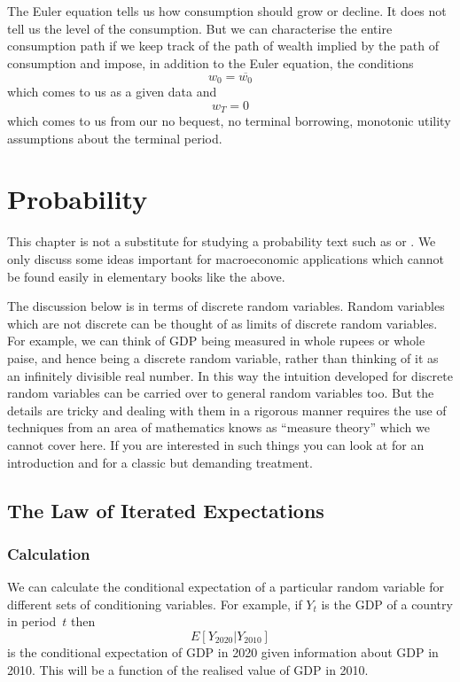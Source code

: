 \documentclass[11pt,reqno,openany]{amsbook}
\theoremstyle{plain}
\theoremstyle{definition}
\begin{document}
The Euler equation tells us how consumption should grow or decline. It
does not tell us the level of the consumption. But we can characterise
the entire consumption path if we keep track of
the path of wealth implied by the path of consumption and impose, in
addition to the Euler equation, the
conditions
\[w_0 = \overline{w_0}\]
which comes to us as a given data and 
\[w_T=0\]
which comes to us from our no bequest, no terminal borrowing,
monotonic utility assumptions about the terminal period.

\chapter{Probability}
This chapter is not a substitute for studying a probability text such
as \cite{chung-elementary} or \cite{ross-probability}. We only discuss
some ideas important for macroeconomic applications which cannot be
found easily in elementary books like the above. 

The discussion below is in terms of discrete random variables. Random
variables which are not discrete can be thought of as limits of
discrete random variables. For example, we can think of GDP being
measured in whole rupees or whole paise, and hence being a discrete
random variable, rather than thinking of it as an infinitely divisible
real number. In this way the intuition developed for discrete random
variables can be carried over to general random variables too. But the
details are tricky and dealing with them in a rigorous manner requires
the use of techniques from an area of mathematics knows as ``measure
theory'' which we cannot cover here. If you are interested in such
things you can look at \cite{jacod-protter-essentials} for an
introduction and \cite{billingsley-prob-measure} for a classic but
demanding treatment.

\section{The Law of Iterated Expectations}
\subsection{Calculation}
We can calculate the conditional expectation of a particular random
variable for different sets of conditioning variables. For example, if
$Y_t$ is the GDP of a country in period~$t$ then
\[E[Y_{2020}|Y_{2010}]\]
is the conditional expectation of GDP in 2020 given information about
GDP in 2010. This will be a function of the realised value of GDP in
2010. 
\end{document}
